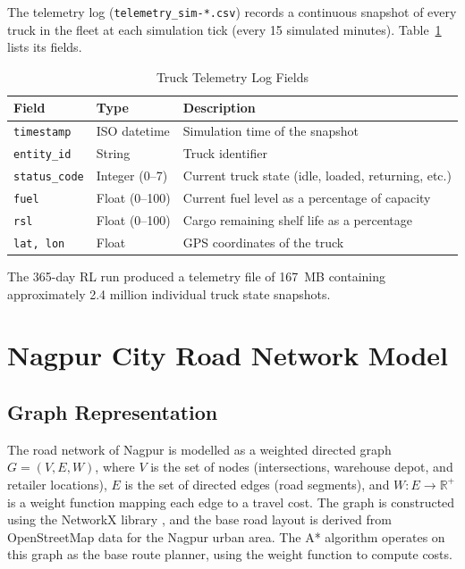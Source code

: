 The telemetry log (\texttt{telemetry\_sim-*.csv}) records a continuous snapshot
of every truck in the fleet at each simulation tick (every 15 simulated minutes).
Table~\ref{tab:telemetry_fields} lists its fields.

\begin{table}[h!]
\centering
\caption{Truck Telemetry Log Fields}
\label{tab:telemetry_fields}
\begin{tabular}{|l|l|l|}
\hline
\textbf{Field}          & \textbf{Type}  & \textbf{Description} \\
\hline
\texttt{timestamp}      & ISO datetime   & Simulation time of the snapshot \\
\hline
\texttt{entity\_id}     & String         & Truck identifier \\
\hline
\texttt{status\_code}   & Integer (0--7) & Current truck state (idle, loaded, returning, etc.) \\
\hline
\texttt{fuel}           & Float (0--100) & Current fuel level as a percentage of capacity \\
\hline
\texttt{rsl}            & Float (0--100) & Cargo remaining shelf life as a percentage \\
\hline
\texttt{lat, lon}       & Float          & GPS coordinates of the truck \\
\hline
\end{tabular}
\end{table}

The 365-day RL run produced a telemetry file of 167~MB containing approximately
2.4 million individual truck state snapshots.

\section{Nagpur City Road Network Model}

\subsection{Graph Representation}

The road network of Nagpur is modelled as a weighted directed graph
$G = (V, E, W)$, where $V$ is the set of nodes (intersections, warehouse depot,
and retailer locations), $E$ is the set of directed edges (road segments), and
$W: E \rightarrow \mathbb{R}^+$ is a weight function mapping each edge to a
travel cost. The graph is constructed using the NetworkX library \cite{networkx2008},
and the base road layout is derived from OpenStreetMap data for the Nagpur urban
area. The A* algorithm operates on this graph as the base route planner, using the
weight function to compute costs.

